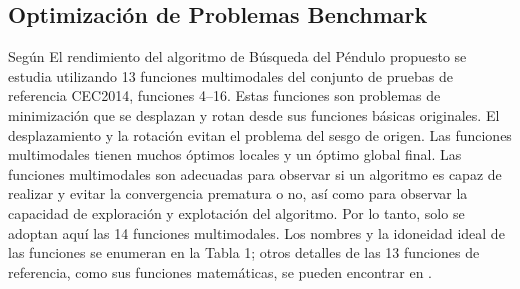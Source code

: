 \documentclass[conference]{IEEEtran}
\begin{document}
\subsection{Optimización de Problemas Benchmark}

Según \cite{aziz2022} El rendimiento del algoritmo de Búsqueda del Péndulo
propuesto se estudia utilizando 13
funciones
multimodales del conjunto de pruebas de referencia CEC2014, funciones 4--16.
Estas funciones son problemas de minimización que se desplazan y rotan desde
sus funciones básicas originales. El desplazamiento y la rotación evitan el
problema del sesgo de origen. Las funciones multimodales tienen muchos óptimos
locales y un óptimo global final. Las funciones multimodales son adecuadas para
observar si un algoritmo es capaz de realizar y evitar la convergencia
prematura o no, así como para observar la capacidad de exploración y
explotación del algoritmo. Por lo tanto, solo se adoptan aquí las 14 funciones
multimodales. Los nombres y la idoneidad ideal de las funciones se enumeran en
la Tabla 1; otros detalles de las 13 funciones de referencia, como sus
funciones matemáticas, se pueden encontrar en \cite{Liang2013}.
\end{document}
